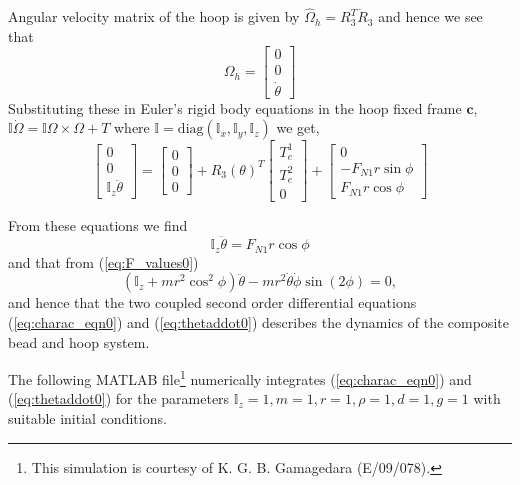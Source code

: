 \documentclass[graybox,envcountchap,sectrefs]{svmonoMuga}
\begin{document}
Angular velocity matrix of the hoop is given by $\widehat{\Omega}_h=R_3^T\dot{R}_3$ and hence we see that
\[ \Omega_h=
\begin{bmatrix}
0\\0\\ \dot{\theta}
\end{bmatrix}
\]
Substituting these in Euler's rigid body equations in the hoop fixed frame $\mathbf{c}$,
$\mathbb{I}\dot{\Omega}=\mathbb{I}\Omega\times\Omega+T$
where $\mathbb{I} = \mathrm{diag}(\mathbb{I}_x,\mathbb{I}_y,\mathbb{I}_z)$
we get,
\begin{equation}
\begin{bmatrix}
0\\0\\\mathbb{I}_z\ddot{\theta}
\end{bmatrix}
=
\begin{bmatrix}
0\\0\\0
\end{bmatrix}
+R_3(\theta)^T
\begin{bmatrix}
T_e^1\\T_e^2\\0
\end{bmatrix}
+
\begin{bmatrix}
0\\-F_{N1}r\sin{\phi}\\F_{N1}r\cos{\phi}
\end{bmatrix}
\label{eq:IOmegadot=()}
\end{equation}

From these equations we find
\[ \mathbb{I}_z\ddot{\theta}=F_{N1}r\cos{\phi} \]
and that from (\ref{eq:F_values0})
\begin{equation}
({\mathbb{I}_z+mr^2\cos^2{\phi}})\ddot{\theta}-{mr^2\dot{\theta}\dot{\phi}\sin(2\phi)}=0,
\label{eq:thetaddot0}
\end{equation}
and hence that the two coupled second order differential equations (\ref{eq:charac_eqn0}) and (\ref{eq:thetaddot0}) describes the dynamics of the composite bead and hoop system.


The following MATLAB file\footnote{This simulation is courtesy of K. G. B. Gamagedara (E/09/078).} numerically integrates (\ref{eq:charac_eqn0}) and (\ref{eq:thetaddot0}) for the parameters $\mathbb{I}_z=1,m=1,r=1, \rho=1, d=1, g=1$ with suitable initial conditions.
\end{document}
